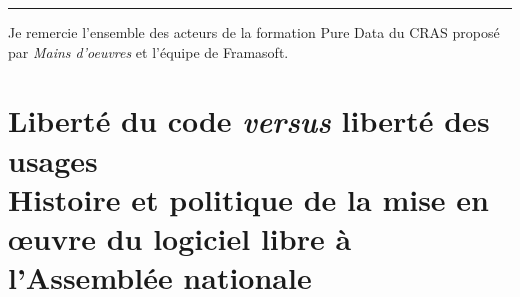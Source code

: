 \documentclass{FramateX}
\begin{document}
\begin{refsection}
\begin{center}
\rule[0.5ex]{5cm}{0.1mm}
\end{center}

Je remercie l'ensemble des acteurs de la formation Pure
Data du CRAS proposé par \textit{Mains d'oeuvres} et
l'équipe de Framasoft.



\printbibliography[heading=subbibliography]
\end{refsection}















\chapter*{Liberté du code \textit{versus} liberté des usages \\ {\small Histoire et politique de la mise en œuvre du logiciel libre à l'Assemblée nationale}}
{}
\end{document}
